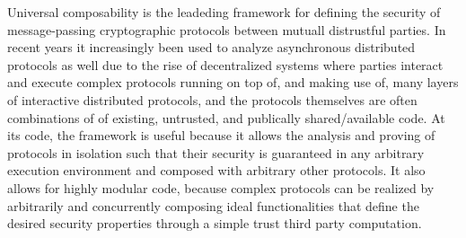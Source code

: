 
Universal composability is the leadeding framework for defining the security of message-passing cryptographic protocols between mutuall distrustful parties.
In recent years it increasingly been used to analyze asynchronous distributed protocols as well due to the rise of decentralized systems where parties interact and execute complex protocols running on top of, and making use of, many layers of interactive distributed protocols, and the protocols themselves are often combinations of of existing, untrusted, and publically shared/available code.
At its code, the framework is useful because it allows the analysis and proving of protocols in isolation such that their security is guaranteed in any arbitrary execution environment and composed with arbitrary other protocols.
It also allows for highly modular code, because complex protocols can be realized by arbitrarily and concurrently composing ideal functionalities that define the desired security properties through a simple trust third party computation. 

